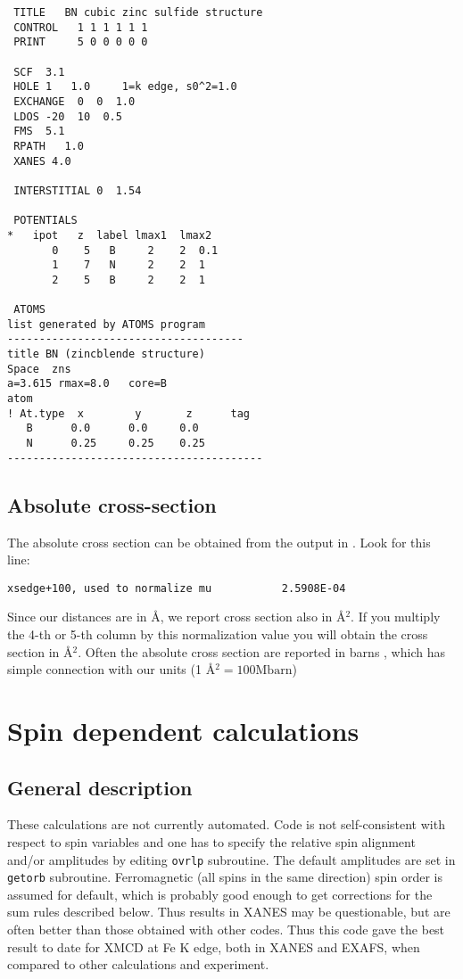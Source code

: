 \documentclass[11pt,oneside]{report} %
\begin{document}
\begin{verbatim}
 TITLE   BN cubic zinc sulfide structure
 CONTROL   1 1 1 1 1 1
 PRINT     5 0 0 0 0 0

 SCF  3.1
 HOLE 1   1.0     1=k edge, s0^2=1.0
 EXCHANGE  0  0  1.0
 LDOS -20  10  0.5
 FMS  5.1
 RPATH   1.0
 XANES 4.0

 INTERSTITIAL 0  1.54

 POTENTIALS
*   ipot   z  label lmax1  lmax2
       0    5   B     2    2  0.1
       1    7   N     2    2  1
       2    5   B     2    2  1

 ATOMS
list generated by ATOMS program
-------------------------------------
title BN (zincblende structure)
Space  zns
a=3.615 rmax=8.0   core=B
atom
! At.type  x        y       z      tag
   B      0.0      0.0     0.0
   N      0.25     0.25    0.25
----------------------------------------
\end{verbatim}


\subsection{Absolute cross-section}
\label{sec:Absol-cross-sect}

The absolute cross section can be obtained from the output in
.  Look for this line:

\begin{verbatim}
xsedge+100, used to normalize mu           2.5908E-04
\end{verbatim}

Since our distances are in \AA, we report cross section also in \AA$^2$.
If you multiply the 4-th or 5-th column by this normalization value
you will obtain the cross section in \AA$^2$. Often the absolute
cross section are reported in barns , which has simple connection
with our units (1 \AA$^2 = 100 \mathrm{Mbarn}$)

\section{Spin dependent calculations}
\label{sec:Spin-depend-calc}

\subsection{General description}
\label{sec:General-description}

These calculations are not currently automated. Code is not
self-consistent with respect to spin variables and one has to specify
the relative spin alignment and/or amplitudes by editing \texttt{ovrlp}
subroutine. The default amplitudes are set in \texttt{getorb} subroutine.
Ferromagnetic (all spins in the same direction) spin order is assumed
for default, which is probably good enough to get corrections for the
sum rules described below.
Thus results in XANES may be
questionable, but are often better than those obtained with other
codes. Thus this code gave the best result to date for XMCD at Fe K
edge, both in XANES and EXAFS, when compared to other calculations and
experiment.
\end{document}
